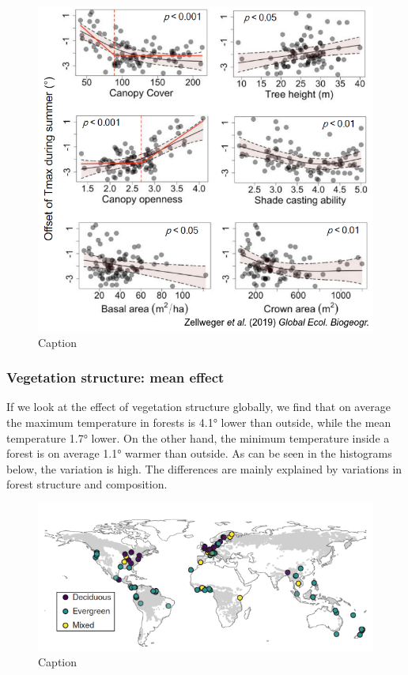 \documentclass[12pt,oneside]{book}
\begin{document}
\begin{figure}

{\centering \includegraphics[width=0.8\linewidth]{figures/Figure1017} 

}

\caption{Caption}\label{fig:Micro17}
\end{figure}

\subsubsection{Vegetation structure: mean
effect}\label{vegetation-structure-mean-effect}

If we look at the effect of vegetation structure globally, we find that
on average the maximum temperature in forests is 4.1° lower than
outside, while the mean temperature 1.7° lower. On the other hand, the
minimum temperature inside a forest is on average 1.1° warmer than
outside. As can be seen in the histograms below, the variation is high.
The differences are mainly explained by variations in forest structure
and composition.

\begin{figure}

{\centering \includegraphics[width=0.5\linewidth]{figures/Figure1018} 

}

\caption{Caption}\label{fig:Micro18}
\end{figure}
\end{document}
